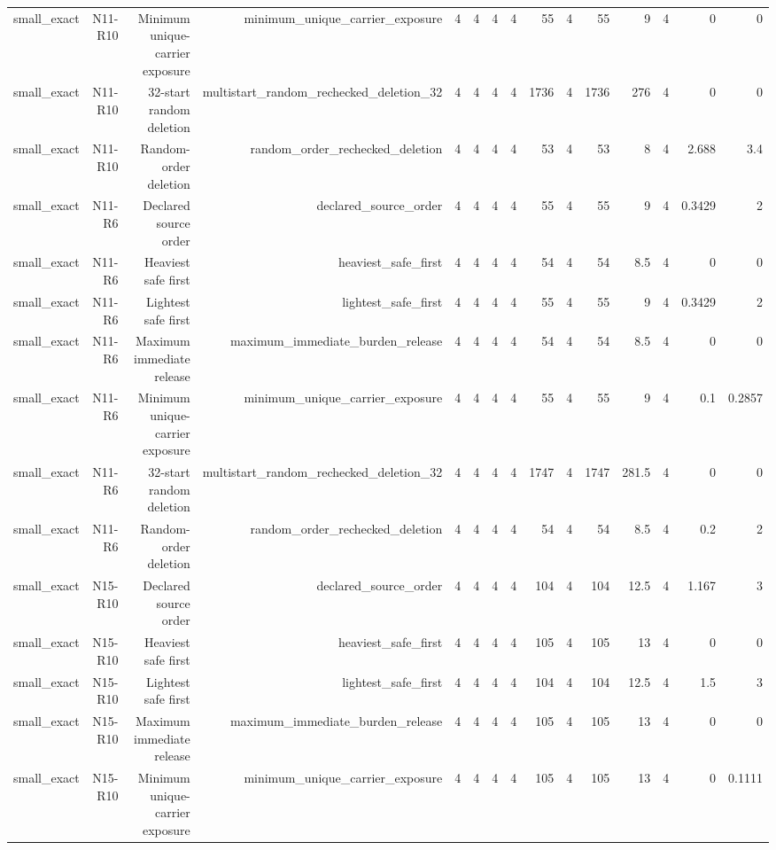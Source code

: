{\begin{longtable}{lrrrrrrrrrrrrrr}
small\_exact & N11-R10 & Minimum unique-carrier exposure & minimum\_unique\_carrier\_exposure & 4 & 4 & 4 & 4 & 55 & 4 & 55 & 9 & 4 & 0 & 0 \\
small\_exact & N11-R10 & 32-start random deletion & multistart\_random\_rechecked\_deletion\_32 & 4 & 4 & 4 & 4 & 1736 & 4 & 1736 & 276 & 4 & 0 & 0 \\
small\_exact & N11-R10 & Random-order deletion & random\_order\_rechecked\_deletion & 4 & 4 & 4 & 4 & 53 & 4 & 53 & 8 & 4 & 2.688 & 3.4 \\
small\_exact & N11-R6 & Declared source order & declared\_source\_order & 4 & 4 & 4 & 4 & 55 & 4 & 55 & 9 & 4 & 0.3429 & 2 \\
small\_exact & N11-R6 & Heaviest safe first & heaviest\_safe\_first & 4 & 4 & 4 & 4 & 54 & 4 & 54 & 8.5 & 4 & 0 & 0 \\
small\_exact & N11-R6 & Lightest safe first & lightest\_safe\_first & 4 & 4 & 4 & 4 & 55 & 4 & 55 & 9 & 4 & 0.3429 & 2 \\
small\_exact & N11-R6 & Maximum immediate release & maximum\_immediate\_burden\_release & 4 & 4 & 4 & 4 & 54 & 4 & 54 & 8.5 & 4 & 0 & 0 \\
small\_exact & N11-R6 & Minimum unique-carrier exposure & minimum\_unique\_carrier\_exposure & 4 & 4 & 4 & 4 & 55 & 4 & 55 & 9 & 4 & 0.1 & 0.2857 \\
small\_exact & N11-R6 & 32-start random deletion & multistart\_random\_rechecked\_deletion\_32 & 4 & 4 & 4 & 4 & 1747 & 4 & 1747 & 281.5 & 4 & 0 & 0 \\
small\_exact & N11-R6 & Random-order deletion & random\_order\_rechecked\_deletion & 4 & 4 & 4 & 4 & 54 & 4 & 54 & 8.5 & 4 & 0.2 & 2 \\
small\_exact & N15-R10 & Declared source order & declared\_source\_order & 4 & 4 & 4 & 4 & 104 & 4 & 104 & 12.5 & 4 & 1.167 & 3 \\
small\_exact & N15-R10 & Heaviest safe first & heaviest\_safe\_first & 4 & 4 & 4 & 4 & 105 & 4 & 105 & 13 & 4 & 0 & 0 \\
small\_exact & N15-R10 & Lightest safe first & lightest\_safe\_first & 4 & 4 & 4 & 4 & 104 & 4 & 104 & 12.5 & 4 & 1.5 & 3 \\
small\_exact & N15-R10 & Maximum immediate release & maximum\_immediate\_burden\_release & 4 & 4 & 4 & 4 & 105 & 4 & 105 & 13 & 4 & 0 & 0 \\
small\_exact & N15-R10 & Minimum unique-carrier exposure & minimum\_unique\_carrier\_exposure & 4 & 4 & 4 & 4 & 105 & 4 & 105 & 13 & 4 & 0 & 0.1111 \\

\end{longtable}}
